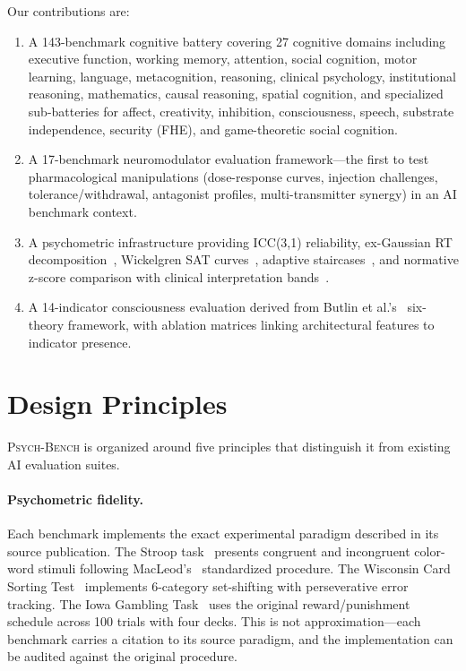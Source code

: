 \documentclass[11pt,letterpaper]{article}
\newcommand{\psychbench}{\textsc{Psych-Bench}}
\begin{document}
Our contributions are:
\begin{enumerate}[nosep]
    \item A 143-benchmark cognitive battery covering 27 cognitive domains including executive function, working memory, attention, social cognition, motor learning, language, metacognition, reasoning, clinical psychology, institutional reasoning, mathematics, causal reasoning, spatial cognition, and specialized sub-batteries for affect, creativity, inhibition, consciousness, speech, substrate independence, security (FHE), and game-theoretic social cognition.
    \item A 17-benchmark neuromodulator evaluation framework---the first to test pharmacological manipulations (dose-response curves, injection challenges, tolerance/withdrawal, antagonist profiles, multi-transmitter synergy) in an AI benchmark context.
    \item A psychometric infrastructure providing ICC(3,1) reliability, ex-Gaussian RT decomposition~\citep{heathcote1996fitting}, Wickelgren SAT curves~\citep{wickelgren1977speed}, adaptive staircases~\citep{levitt1971transformed}, and normative z-score comparison with clinical interpretation bands~\citep{cicchetti1994guidelines}.
    \item A 14-indicator consciousness evaluation derived from Butlin et al.'s~\citep{butlin2023consciousness} six-theory framework, with ablation matrices linking architectural features to indicator presence.
\end{enumerate}

\section{Design Principles}
\label{sec:principles}

\psychbench{} is organized around five principles that distinguish it from existing AI evaluation suites.

\paragraph{Psychometric fidelity.} Each benchmark implements the exact experimental paradigm described in its source publication. The Stroop task~\citep{stroop1935interference} presents congruent and incongruent color-word stimuli following MacLeod's~\citep{macleod1991half} standardized procedure. The Wisconsin Card Sorting Test~\citep{berg1948simple} implements 6-category set-shifting with perseverative error tracking. The Iowa Gambling Task~\citep{bechara1994insensitivity} uses the original reward/punishment schedule across 100 trials with four decks. This is not approximation---each benchmark carries a citation to its source paradigm, and the implementation can be audited against the original procedure.
\end{document}
